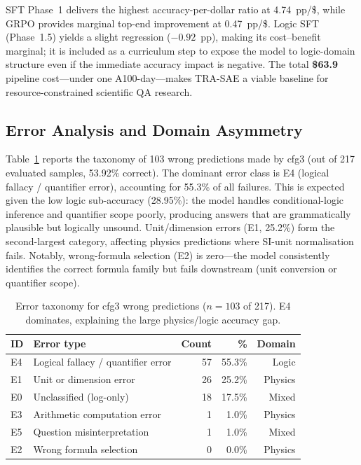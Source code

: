 \documentclass{ieeeaccess}
\newcommand{\modelname}{\textsc{TRA-SAE}}
\begin{document}
SFT Phase~1 delivers the highest accuracy-per-dollar ratio at 4.74~pp/\$,
while GRPO provides marginal top-end improvement at 0.47~pp/\$.
Logic SFT (Phase~1.5) yields a slight regression ($-0.92$~pp), making
its cost--benefit marginal; it is included as a curriculum step to
expose the model to logic-domain structure even if the immediate accuracy
impact is negative.
The total \textbf{\$63.9} pipeline cost---under one A100-day---makes
\modelname{} a viable baseline for resource-constrained scientific QA
research.


\subsection{Error Analysis and Domain Asymmetry}
\label{sec:error_analysis}

Table~\ref{tab:errors} reports the taxonomy of 103 wrong predictions
made by cfg3 (out of 217 evaluated samples, 53.92\% correct).
The dominant error class is E4 (logical fallacy / quantifier error),
accounting for 55.3\% of all failures.
This is expected given the low logic sub-accuracy (28.95\%):
the model handles conditional-logic inference and quantifier scope poorly,
producing answers that are grammatically plausible but logically unsound.
Unit/dimension errors (E1, 25.2\%) form the second-largest category,
affecting physics predictions where SI-unit normalisation fails.
Notably, wrong-formula selection (E2) is zero---the model consistently
identifies the correct formula family but fails downstream (unit conversion
or quantifier scope).

\begin{table}[t]
  \centering
  \caption{Error taxonomy for cfg3 wrong predictions ($n=103$ of 217).
           E4 dominates, explaining the large physics/logic accuracy gap.}
  \label{tab:errors}
  \begin{tabular}{llrrr}
    \toprule
    \textbf{ID} & \textbf{Error type} & \textbf{Count} & \textbf{\%} & \textbf{Domain} \\
    \midrule
    E4 & Logical fallacy / quantifier error & 57 & 55.3\% & Logic \\
    E1 & Unit or dimension error            & 26 & 25.2\% & Physics \\
    E0 & Unclassified (log-only)            & 18 & 17.5\% & Mixed \\
    E3 & Arithmetic computation error       &  1 &  1.0\% & Physics \\
    E5 & Question misinterpretation         &  1 &  1.0\% & Mixed \\
    E2 & Wrong formula selection            &  0 &  0.0\% & Physics \\
    \bottomrule
  \end{tabular}
\end{table}
\end{document}
